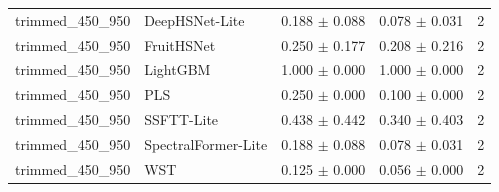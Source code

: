 \begin{table}[t]
\begin{tabular}{lllll}
trimmed\_450\_950 & DeepHSNet-Lite & 0.188 $\pm$ 0.088 & 0.078 $\pm$ 0.031 & 2 \\
trimmed\_450\_950 & FruitHSNet & 0.250 $\pm$ 0.177 & 0.208 $\pm$ 0.216 & 2 \\
trimmed\_450\_950 & LightGBM & 1.000 $\pm$ 0.000 & 1.000 $\pm$ 0.000 & 2 \\
trimmed\_450\_950 & PLS & 0.250 $\pm$ 0.000 & 0.100 $\pm$ 0.000 & 2 \\
trimmed\_450\_950 & SSFTT-Lite & 0.438 $\pm$ 0.442 & 0.340 $\pm$ 0.403 & 2 \\
trimmed\_450\_950 & SpectralFormer-Lite & 0.188 $\pm$ 0.088 & 0.078 $\pm$ 0.031 & 2 \\
trimmed\_450\_950 & WST & 0.125 $\pm$ 0.000 & 0.056 $\pm$ 0.000 & 2 \\
\hline
\end{tabular}
\end{table}